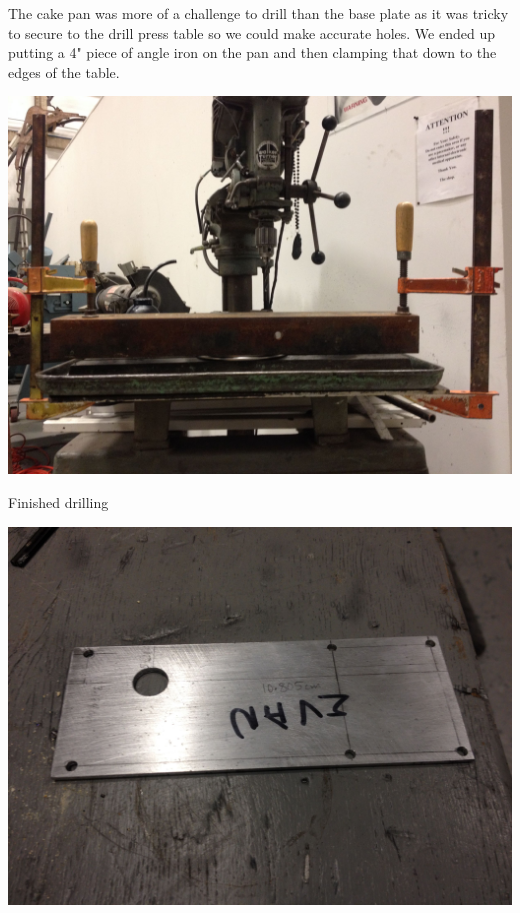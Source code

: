 \documentclass[11pt]{article} %
\begin{document}
The cake pan was more of a challenge to drill than the base plate as it was tricky to secure to the drill press table so we could make accurate holes. We ended up putting a 4" piece of angle iron on the pan and then clamping that down to the edges of the table. 

\begin{center}
\includegraphics[scale=0.15]{feed/05.jpeg}
\end{center}

Finished drilling

\begin{center}
\includegraphics[scale=0.10]{feed/06.jpeg}
\end{center}
\end{document}
